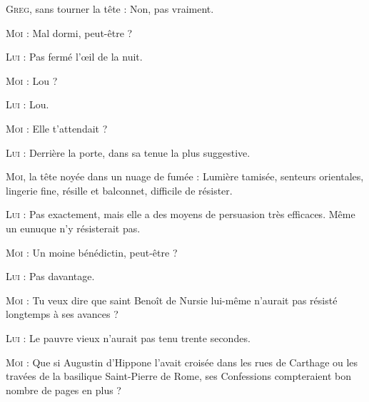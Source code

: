 \begin{dialogue}

%
%
%
        
\textsc{Greg}, sans tourner la tête : Non, pas vraiment.

\textsc{Moi} : Mal dormi, peut-être ?

\textsc{Lui} : Pas fermé l’œil de la nuit.

\textsc{Moi} : Lou ?

\textsc{Lui} : Lou.

\textsc{Moi} : Elle t’attendait ?

\textsc{Lui} : Derrière la porte, dans sa tenue la plus suggestive.

\textsc{Moi}, la tête noyée dans un nuage de fumée : Lumière tamisée, senteurs orientales, lingerie fine, résille et balconnet, difficile de résister.

\textsc{Lui} : Pas exactement, mais elle a des moyens de persuasion très efficaces. Même un eunuque n’y résisterait pas.

\textsc{Moi} : Un moine bénédictin, peut-être ?

\textsc{Lui} : Pas davantage.

\textsc{Moi} : Tu veux dire que saint Benoît de Nursie lui-même n’aurait pas résisté longtemps à ses avances ?

\textsc{Lui} : Le pauvre vieux n’aurait pas tenu trente secondes.

%
%
%
\textsc{Moi} : Que si Augustin d’Hippone l’avait croisée dans les rues de Carthage ou les travées de la basilique Saint-Pierre de Rome, ses Confessions compteraient bon nombre de pages en plus ?


\end{dialogue}
